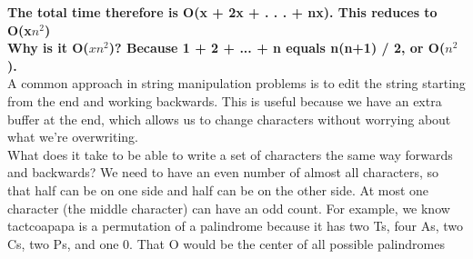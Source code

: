 \documentclass[14pt]{extarticle}
\begin{document}
\textbf{The total time therefore is O(x + 2x + . . . + nx). This reduces to O(x$n^2$)}\\
\textbf{Why is it O($xn^2$)? Because 1 + 2 + ... + n equals n(n+1) / 2, or O($n^2$).}\\

A common approach in string manipulation problems is to edit the string starting from 
the end and working backwards. This is useful because we have an extra buffer at the end,
which allows us to change characters without worrying about what we're overwriting.\\

What does it take to be able to write a set of characters the same way forwards and 
backwards? We need to have an even number of almost all characters, so that half can 
be on one side and half can be on the other side. At most one character (the middle character)
can have an odd count. For example, we know tactcoapapa is a permutation of a palindrome
because it has two Ts, four As, two Cs, two Ps, and one 0. That O would be the center 
of all possible palindromes
\end{document}
